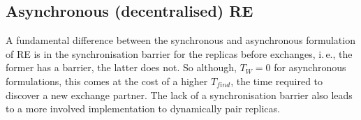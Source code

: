 \documentclass{rspublic}
\newcommand{\alnote}[1]{ {\textcolor{blue} { ***andre: #1 }}}
\newcommand{\athotanote}[1]{ {\textcolor{green} { ***athota: #1 }}}
\newcommand{\alnote}[1]{}
\newcommand{\athotanote}[1]{}
\begin{document}

\subsection{Asynchronous (decentralised) RE}





A fundamental difference between the synchronous and asynchronous
formulation of RE is in the synchronisation barrier for the replicas
before exchanges, i.\,e., the former has a barrier, the latter does not.
So although, $T_W = 0$ for asynchronous formulations, this comes at
the cost of a higher $T_{find}$, the time required to discover a new
exchange partner. The lack of a synchronisation barrier
also leads to a more involved implementation to dynamically pair replicas.
\end{document}
